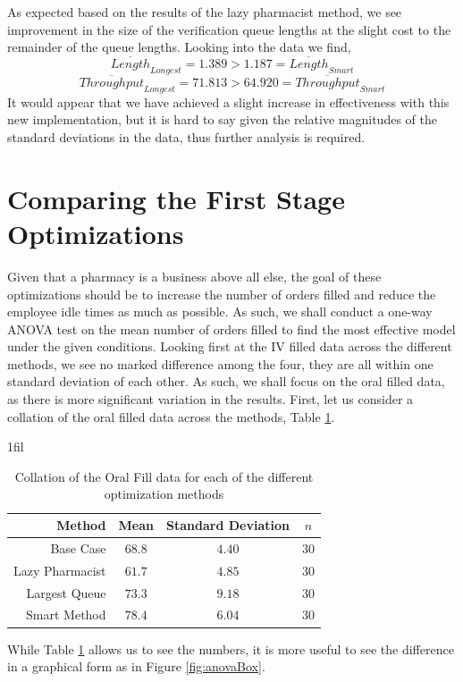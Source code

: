 \documentclass[10pt]{report}            %
\makeatletter
\newcommand*{\centerfloat}{%
  \parindent \z@
  \leftskip \z@ \@plus 1fil \@minus \textwidth
  \rightskip\leftskip
  \parfillskip \z@skip}
\makeatother
\begin{document}
As expected based on the results of the lazy pharmacist method, we see improvement in the size of the verification queue lengths at the slight cost to the remainder of the queue lengths. Looking into the data we find,
\[\overline{Length}_{Longest}=1.389 > 1.187 = \overline{Length}_{Smart}\]
\[\overline{Throughput}_{Longest}=71.813 > 64.920 = \overline{Throughput}_{Smart}\]
It would appear that we have achieved a slight increase in effectiveness with this new implementation, but it is hard to say given the relative magnitudes of the standard deviations in the data, thus further analysis is required.
\section*{Comparing the First Stage Optimizations}
Given that a pharmacy is a business above all else, the goal of these optimizations should be to increase the number of orders filled and reduce the employee idle times as much as possible. As such, we shall conduct a one-way ANOVA test on the mean number of orders filled to find the most effective model under the given conditions. Looking first at the IV filled data across the different methods, we see no marked difference among the four, they are all within one standard deviation of each other. As such, we shall focus on the oral filled data, as there is more significant variation in the results. First, let us consider a collation of the oral filled data across the methods, Table \ref{table:collate}.
\begin{table}[H]
\centerfloat
\begin{tabular}{|r||c|c|c|}
\hline
Method & Mean & Standard Deviation & $n$\\\hline\hline
Base Case & $68.8$ & $4.40$ & $30$\\\hline
Lazy Pharmacist & $61.7$ & $4.85$ & $30$\\\hline
Largest Queue & $73.3$ & $9.18$ & $30$\\\hline
Smart Method & $78.4$ & $6.04$ & $30$\\\hline
\end{tabular}
\caption{Collation of the Oral Fill data for each of the different optimization methods}
\label{table:collate}
\end{table}
While Table \ref{table:collate} allows us to see the numbers, it is more useful to see the difference in a graphical form as in Figure \ref{fig:anovaBox}.
\end{document}
